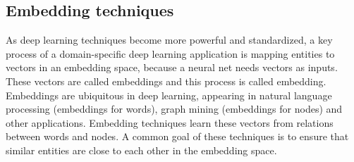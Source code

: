 \documentclass{article} %
\begin{document}
\subsection{Embedding techniques}
As deep learning techniques become more powerful and standardized,
a key process of a domain-specific deep learning application
is mapping entities to vectors in an embedding space,
because a neural net needs vectors as inputs.
These vectors are called embeddings and this process is called embedding.
Embeddings are ubiquitous in deep learning,
appearing in natural language processing (embeddings for words),
graph mining (embeddings for nodes) and other applications.
Embedding techniques learn these vectors from relations between words and nodes.
A common goal of these techniques is to ensure that
similar entities are close to each other in the embedding space.
\end{document}
